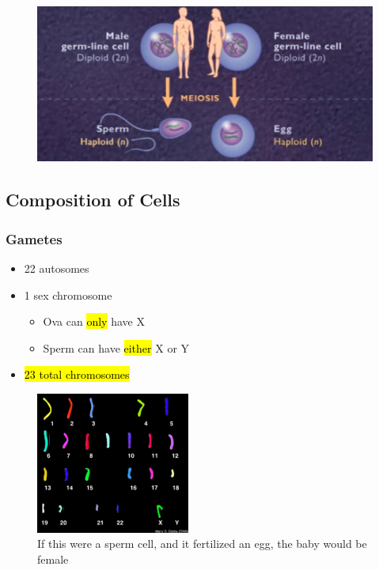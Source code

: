 \documentclass[a4paper,12pt]{article}
\begin{document}
\begin{figure}[H]
    \centering
    \includegraphics[width=\textwidth]{loid}
\end{figure}

\subsection{Composition of Cells}

\subsubsection{Gametes}
\begin{itemize}
    \item{22 autosomes}
    \item{
            1 sex chromosome
            \begin{itemize}
                \item{Ova can \hl{only} have \female X}
                \item{Sperm can have \hl{either} \female X or \male Y}
            \end{itemize}
        }
    \item{\hl{23 total chromosomes}}
\end{itemize}

\begin{figure}[H]
    \centering
    \includegraphics[width=0.45\textwidth]{23}
    \caption{If this were a sperm cell, and it fertilized an egg, the baby would be female}
\end{figure}
\end{document}
